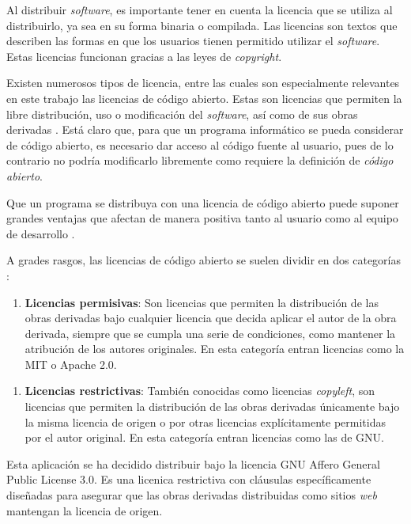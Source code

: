 Al distribuir \textit{software}, es importante tener en cuenta la licencia que se utiliza al distribuirlo, ya sea en su forma binaria o compilada. Las licencias son textos que describen las formas en que los usuarios tienen permitido utilizar el \textit{software}. Estas licencias funcionan gracias a las leyes de \textit{copyright}.

Existen numerosos tipos de licencia, entre las cuales son especialmente relevantes en este trabajo las licencias de código abierto. Estas son licencias que permiten la libre distribución, uso o modificación del \textit{software}, así como de sus obras derivadas \citationNeeded. Está claro que, para que un programa informático se pueda considerar de código abierto, es necesario dar acceso al código fuente al usuario, pues de lo contrario no podría modificarlo libremente como requiere la definición de \textit{código abierto}.

Que un programa se distribuya con una licencia de código abierto puede suponer grandes ventajas que afectan de manera positiva tanto al usuario como al equipo de desarrollo \autocite{almarzouq2005open, Heron2013}.

A grades rasgos, las licencias de código abierto se suelen dividir en dos categorías \citationNeeded:

\begin{enumerate}
	\item \textbf{Licencias permisivas}: Son licencias que permiten la distribución de las obras derivadas bajo cualquier licencia que decida aplicar el autor de la obra derivada, siempre que se cumpla una serie de condiciones, como mantener la atribución de los autores originales. En esta categoría entran licencias como la MIT o Apache 2.0.
\end{enumerate}

\begin{enumerate}
	\item \textbf{Licencias restrictivas}: También conocidas como licencias \textit{copyleft}, son licencias que permiten la distribución de las obras derivadas únicamente bajo la misma licencia de origen o por otras licencias explícitamente permitidas por el autor original. En esta categoría entran licencias como las de GNU.
\end{enumerate}

Esta aplicación se ha decidido distribuir bajo la licencia GNU Affero General Public License 3.0. Es una licenica restrictiva con cláusulas específicamente diseñadas para asegurar que las obras derivadas distribuidas como sitios \textit{web} mantengan la licencia de origen. \citationNeeded
